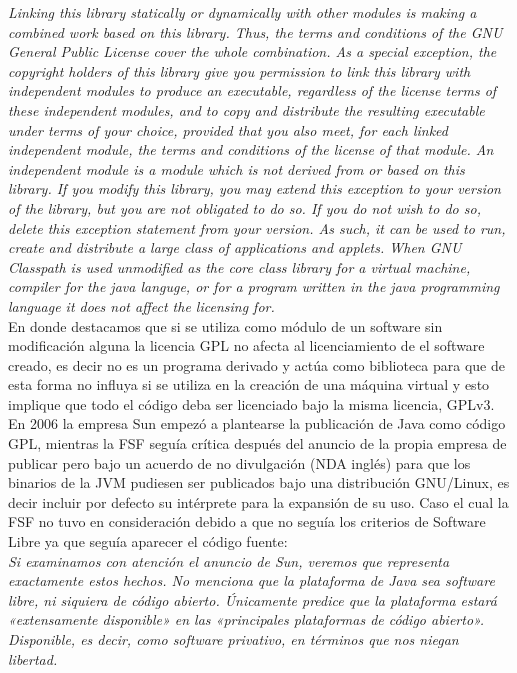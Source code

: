 \documentclass[11pt]{scrartcl}
\begin{document}
    \emph{Linking this library statically or dynamically with other modules is making a combined work based on this library. Thus, the terms and conditions of the GNU General Public License cover the whole combination.
As a special exception, the copyright holders of this library give you permission to link this library with independent modules to produce an executable, regardless of the license terms of these independent modules, and to copy and distribute the resulting executable under terms of your choice, provided that you also meet, for each linked independent module, the terms and conditions of the license of that module. An independent module is a module which is not derived from or based on this library. If you modify this library, you may extend this exception to your version of the library, but you are not obligated to do so. If you do not wish to do so, delete this exception statement from your version.
As such, it can be used to run, create and distribute a large class of applications and applets. When GNU Classpath is used unmodified as the core class library for a virtual machine, compiler for the java languge, or for a program written in the java programming language it does not affect the licensing for.}\\

En donde destacamos que si se utiliza como módulo de un software sin modificación alguna la licencia GPL no afecta al licenciamiento de el software creado, es decir no es un programa derivado y actúa como biblioteca para que de esta forma no influya si se utiliza en la creación de una máquina virtual y esto implique que todo el código deba ser licenciado bajo la misma licencia, GPLv3.\\

En 2006 la empresa Sun empezó a plantearse la publicación de Java como código GPL, mientras la FSF seguía crítica después del anuncio de la propia empresa de publicar pero bajo un acuerdo de no divulgación (NDA inglés) para que los binarios de la JVM pudiesen ser publicados bajo una distribución GNU/Linux, es decir incluir por defecto su intérprete para la expansión de su uso. Caso el cual la FSF no tuvo en consideración debido a que no seguía los criterios de Software Libre ya que seguía aparecer el código fuente:\\

    \emph{Si examinamos con atención el anuncio de Sun, veremos que representa exactamente estos hechos. No menciona que la plataforma de Java sea software libre, ni siquiera de código abierto. Únicamente predice que la plataforma estará «extensamente disponible» en las «principales plataformas de código abierto». Disponible, es decir, como software privativo, en términos que nos niegan libertad.}
\end{document}
